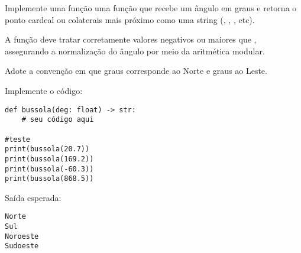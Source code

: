 Implemente uma função uma função  que recebe um ângulo em graus e retorna o
ponto cardeal ou colaterais mais próximo como uma string (, , , etc).

A função deve tratar corretamente valores negativos ou maiores que , assegurando a normalização do
ângulo por meio da aritmética modular.

Adote a convenção em que  graus corresponde ao Norte e  graus ao Leste.
\begin{center}
\end{center}

Implemente o código:
\begin{verbatim}
def bussola(deg: float) -> str:
    # seu código aqui

#teste
print(bussola(20.7))
print(bussola(169.2))
print(bussola(-60.3))
print(bussola(868.5))
\end{verbatim}

Saída esperada:
\begin{verbatim}
Norte
Sul
Noroeste
Sudoeste
\end{verbatim}
